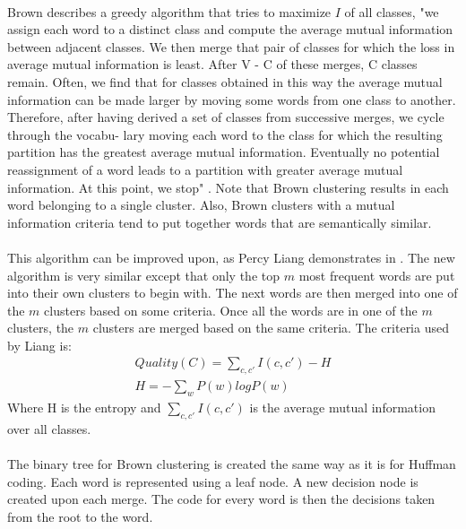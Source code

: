 \documentclass[12pt]{ociamthesis}  %
\begin{document}
\paragraph{}
Brown describes a greedy algorithm that tries to maximize $I$ of all classes, "we assign each word to a distinct class and compute the average mutual information 
between adjacent classes. We then merge that pair of classes for which the loss in 
average mutual information is least. After V - C of these merges, C classes remain. 
Often, we find that for classes obtained in this way the average mutual information 
can be made larger by moving some words from one class to another. Therefore, after 
having derived a set of classes from successive merges, we cycle through the vocabu- 
lary moving each word to the class for which the resulting partition has the greatest 
average mutual information. Eventually no potential reassignment of a word leads to 
a partition with greater average mutual information. At this point, we stop" \cite[pg. 472]{Brown1992}.  
Note that Brown clustering results in each word belonging to a single cluster. Also, Brown clusters with a mutual information criteria tend to put together words that are semantically similar.
\paragraph{}
This algorithm can be improved upon, as Percy Liang demonstrates in \cite{Liang2005}. The new algorithm is very similar except that only the top $m$ most frequent words are put into their own clusters to begin with. The next words are then merged into one of the $m$ clusters based on some criteria. Once all the words are in one of the $m$ clusters, the $m$ clusters are merged based on the same criteria.
The criteria used by Liang is:
\begin{align}
Quality(C) = \sum_{c,c'} I(c,c') - H
\\
H= -\sum_w P(w)logP(w) \nonumber
\end{align}
Where H is the entropy and $\sum_{c,c'} I(c,c')$ is the average mutual information over all classes.
\paragraph{}
The binary tree for Brown clustering is created the same way as it is for Huffman coding. Each word is represented using a leaf node. A new decision node is created upon each merge. The code for every word is then the decisions taken from the root to the word.
\end{document}
